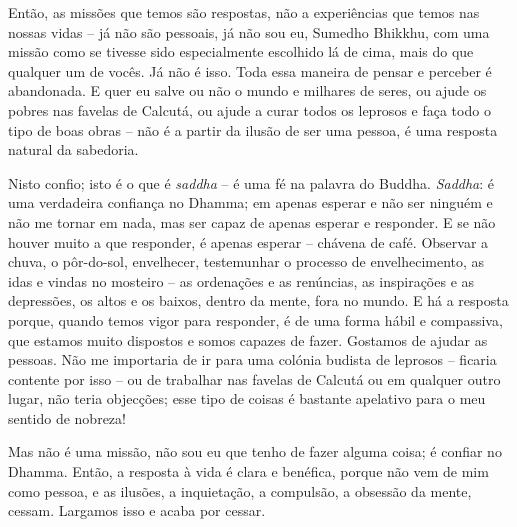 Então, as missões que temos são respostas, não a experiências que temos nas
nossas vidas -- já não são pessoais, já não sou eu, Sumedho Bhikkhu, com uma
missão como se tivesse sido especialmente escolhido lá de cima, mais do que
qualquer um de vocês. Já não é isso. Toda essa maneira de pensar e perceber é
abandonada. E quer eu salve ou não o mundo e milhares de seres, ou ajude os
pobres nas favelas de Calcutá, ou ajude a curar todos os leprosos e faça todo o
tipo de boas obras -- não é a partir da ilusão de ser uma pessoa, é uma resposta
natural da sabedoria.

Nisto confio; isto é o que é \emph{saddha} -- é uma fé na palavra do Buddha.
\emph{Saddha}: é uma verdadeira confiança no Dhamma; em apenas esperar e não ser
ninguém e não me tornar em nada, mas ser capaz de apenas esperar e responder. E
se não houver muito a que responder, é apenas esperar -- chávena de café.
Observar a chuva, o pôr-do-sol, envelhecer, testemunhar o processo de
envelhecimento, as idas e vindas no mosteiro -- as ordenações e as renúncias, as
inspirações e as depressões, os altos e os baixos, dentro da mente, fora no
mundo. E há a resposta porque, quando temos vigor para responder, é de uma forma
hábil e compassiva, que estamos muito dispostos e somos capazes de fazer.
Gostamos de ajudar as pessoas. Não me importaria de ir para uma colónia budista
de leprosos -- ficaria contente por isso -- ou de trabalhar nas favelas de
Calcutá ou em qualquer outro lugar, não teria objecções; esse tipo de coisas é
bastante apelativo para o meu sentido de nobreza!

Mas não é uma missão, não sou eu que tenho de fazer alguma coisa; é confiar no
Dhamma. Então, a resposta à vida é clara e benéfica, porque não vem de mim como
pessoa, e as ilusões, a inquietação, a compulsão, a obsessão da mente, cessam.
Largamos isso e acaba por cessar.


